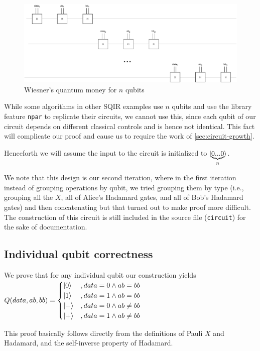 \documentclass{article}
\begin{document}
\begin{figure}[h]
    \centering
    \includegraphics[width=\textwidth]{res/Wiesner.pdf}
    \caption{Wiesner's quantum money for $n$ qubits}
    \label{fig:circuit}
\end{figure}

While some algorithms in other SQIR examples use $n$ qubits and use the library feature \texttt{npar} to replicate their circuits, we cannot use this, since each qubit of our circuit depends on different classical controls and is hence not identical. This fact will complicate our proof and cause us to require the work of \cref{sec:circuit-growth}.


Henceforth we will assume the input to the circuit is initialized to $\ket{\underbrace{0...0}_n}$.

We note that this design is our second iteration, where in the first iteration instead of grouping operations by qubit, we tried grouping them by type (i.e., grouping all the $X$, all of Alice's Hadamard gates, and all of Bob's Hadamard gates) and then concatenating but that turned out to make proof more difficult. The construction of this circuit is still included in the source file (\texttt{circuit}) for the sake of documentation.

\subsection{Individual qubit correctness}\label{sec:qubit-correct}
We prove that for any individual qubit our construction yields 
$Q(data,ab,bb) = \begin{cases} 
\ket{0}&, data=0 \wedge ab=bb\\
\ket{1}&, data=1 \wedge ab=bb\\
\ket{-}&, data=0 \wedge ab \neq bb\\
\ket{+}&, data=1 \wedge ab \neq bb
\end{cases}
$

This proof basically follows directly from the definitions of Pauli $X$ and Hadamard, and the self-inverse property of Hadamard.
\end{document}
